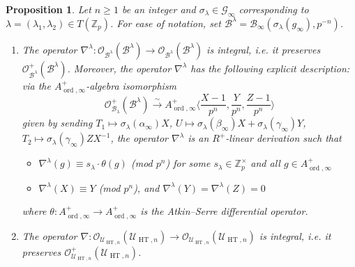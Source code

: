 \documentclass[10pt, oneside]{amsart}
\numberwithin{equation}{subsection}
\newtheorem{proposition}[equation]{Proposition}
\theoremstyle{definition}
\theoremstyle{remark}
\newcommand{\mbb}[1]{\mathbb{#1}}
\newcommand{\opn}[1]{\operatorname{#1}}
\begin{document}
\begin{proposition} \label{PropExplicitForm}
Let $n \geq 1$ be an integer and $\sigma_\lambda \in \mathscr{G}_\infty$ corresponding to $\lambda = (\lambda_1, \lambda_2) \in T(\mbb{Z}_p)$. For ease of notation, set $\mathcal{B}^{\lambda} = \mathcal{B}_{\infty}(\sigma_{\lambda}(g_\infty), p^{-n})$. 
\begin{enumerate}
    \item The operator $\nabla^{\lambda} \colon \mathcal{O}_{\mathcal{B}^{\lambda}}(\mathcal{B}^{\lambda}) \to \mathcal{O}_{\mathcal{B}^{\lambda}}(\mathcal{B}^{\lambda})$ is integral, i.e. it preserves $\mathcal{O}^+_{\mathcal{B}^{\lambda}}(\mathcal{B}^{\lambda})$. Moreover, the operator $\nabla^{\lambda}$ has the following explicit description:
    via the $A_{\opn{ord}, \infty}^+$-algebra isomorphism
    \begin{equation} \label{OBlambdaiso}
    \mathcal{O}^+_{\mathcal{B}_{\lambda}}(\mathcal{B}^{\lambda}) \xrightarrow{\sim} A_{\opn{ord}, \infty}^+ \langle \frac{X-1}{p^n}, \frac{Y}{p^n}, \frac{Z-1}{p^n} \rangle 
    \end{equation}
    given by sending $T_1 \mapsto \sigma_{\lambda}(\alpha_{\infty}) X$, $U \mapsto \sigma_{\lambda}(\beta_{\infty}) X + \sigma_{\lambda}(\gamma_{\infty}) Y$, $T_2 \mapsto \sigma_{\lambda}(\gamma_{\infty}) Z X^{-1}$, the operator $\nabla^{\lambda}$ is an $R^+$-linear derivation such that
    \begin{itemize}
        \item $\nabla^{\lambda}(g) \equiv s_{\lambda} \cdot \theta(g)$ (mod $ p^n$) for some $s_{\lambda} \in \mbb{Z}_p^{\times}$ and all $g \in A_{\opn{ord}, \infty}^+$
        \item $\nabla^{\lambda}(X) \equiv Y$ (mod $p^n$), and $\nabla^{\lambda}(Y) = \nabla^{\lambda}(Z) = 0$
    \end{itemize}
    where $\theta \colon A_{\opn{ord}, \infty}^+ \to A_{\opn{ord}, \infty}^+$ is the Atkin--Serre differential operator.
    \item The operator $\nabla \colon \mathcal{O}_{\mathcal{U}_{\opn{HT}, n}}(\mathcal{U}_{\opn{HT}, n}) \to \mathcal{O}_{\mathcal{U}_{\opn{HT}, n}}(\mathcal{U}_{\opn{HT}, n})$ is integral, i.e. it preserves $\mathcal{O}^+_{\mathcal{U}_{\opn{HT}, n}}(\mathcal{U}_{\opn{HT}, n})$.
\end{enumerate}
\end{proposition}
\end{document}
